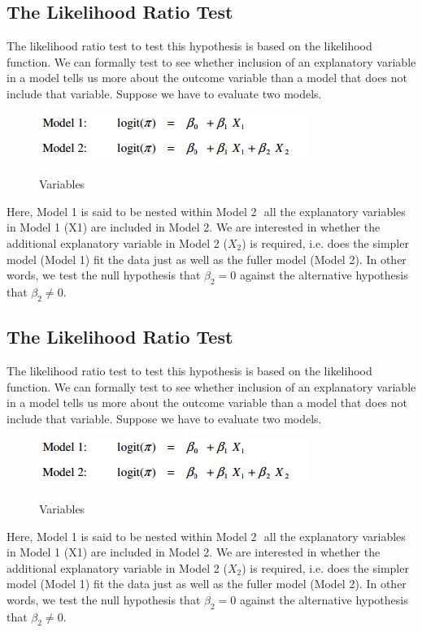 ﻿\documentclass[a4paper,12pt]{article}
\begin{document}
\subsection{The Likelihood Ratio Test}
The likelihood ratio test to test this hypothesis is based on the likelihood
function. We can formally test to see whether inclusion of an explanatory variable in a model tells us
more about the outcome variable than a model that does not include that variable. Suppose
we have to evaluate two models. 
\begin{center}
	\begin{figure}[h!]
		\includegraphics[scale=0.75]{LogWeek10D}\\
		\caption{Variables}
	\end{figure}
\end{center}
Here, Model 1 is said to be nested within Model 2  all the explanatory variables in Model 1
(X1) are included in Model 2. We are interested in whether the additional explanatory
variable in Model 2 ($X_2$) is required, i.e. does the simpler model (Model 1) fit the data just as
well as the fuller model (Model 2). In other words, we test the null hypothesis that $\beta_2 = 0$
against the alternative hypothesis that $\beta_2 \neq 0$. 




\subsection{The Likelihood Ratio Test}
The likelihood ratio test to test this hypothesis is based on the likelihood
function. We can formally test to see whether inclusion of an explanatory variable in a model tells us
more about the outcome variable than a model that does not include that variable. Suppose
we have to evaluate two models. 
\begin{center}
	\begin{figure}[h!]
		\includegraphics[scale=0.75]{LogWeek10D}\\
		\caption{Variables}
	\end{figure}
\end{center}
Here, Model 1 is said to be nested within Model 2  all the explanatory variables in Model 1
(X1) are included in Model 2. We are interested in whether the additional explanatory
variable in Model 2 ($X_2$) is required, i.e. does the simpler model (Model 1) fit the data just as
well as the fuller model (Model 2). In other words, we test the null hypothesis that $\beta_2 = 0$
against the alternative hypothesis that $\beta_2 \neq 0$. 
\end{document}
